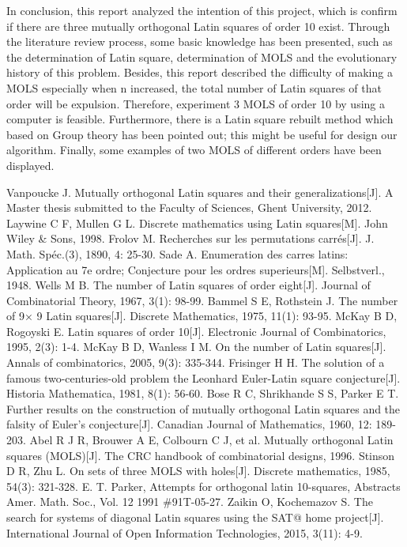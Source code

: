 \documentclass[12pt]{article}
\begin{document}
In conclusion, this report analyzed the intention of this project, which is confirm if there are three mutually orthogonal Latin squares of order 10 exist. Through the literature review process, some basic knowledge has been presented, such as the determination of Latin square, determination of MOLS and the evolutionary history of this problem. Besides, this report described the difficulty of making a MOLS especially when n increased, the total number of Latin squares of that order will be expulsion. Therefore, experiment 3 MOLS of order 10 by using a computer is feasible. Furthermore, there is a Latin square rebuilt method which based on Group theory has been pointed out; this might be useful for design our algorithm. Finally, some examples of two MOLS of different orders have been displayed.
\begin{thebibliography}{99}  

Vanpoucke J. Mutually orthogonal Latin squares and their generalizations[J]. A Master thesis submitted to the Faculty of Sciences, Ghent University, 2012.
Laywine C F, Mullen G L. Discrete mathematics using Latin squares[M]. John Wiley \& Sons, 1998.
Frolov M. Recherches sur les permutations carrés[J]. J. Math. Spéc.(3), 1890, 4: 25-30.
Sade A. Enumeration des carres latins: Application au 7e ordre; Conjecture pour les ordres superieurs[M]. Selbstverl., 1948.
Wells M B. The number of Latin squares of order eight[J]. Journal of Combinatorial Theory, 1967, 3(1): 98-99.
Bammel S E, Rothstein J. The number of 9× 9 Latin squares[J]. Discrete Mathematics, 1975, 11(1): 93-95.
McKay B D, Rogoyski E. Latin squares of order 10[J]. Electronic Journal of Combinatorics, 1995, 2(3): 1-4.
McKay B D, Wanless I M. On the number of Latin squares[J]. Annals of combinatorics, 2005, 9(3): 335-344.
Frisinger H H. The solution of a famous two-centuries-old problem the Leonhard Euler-Latin square conjecture[J]. Historia Mathematica, 1981, 8(1): 56-60.
Bose R C, Shrikhande S S, Parker E T. Further results on the construction of mutually orthogonal Latin squares and the falsity of Euler's conjecture[J]. Canadian Journal of Mathematics, 1960, 12: 189-203.
Abel R J R, Brouwer A E, Colbourn C J, et al. Mutually orthogonal Latin squares (MOLS)[J]. The CRC handbook of combinatorial designs, 1996.
Stinson D R, Zhu L. On sets of three MOLS with holes[J]. Discrete mathematics, 1985, 54(3): 321-328.
E. T. Parker, Attempts for orthogonal latin 10-squares, Abstracts Amer. Math. Soc., Vol. 12 1991 \#91T-05-27.
Zaikin O, Kochemazov S. The search for systems of diagonal Latin squares using the SAT@ home project[J]. International Journal of Open Information Technologies, 2015, 3(11): 4-9.



\end{thebibliography}
\end{document}
